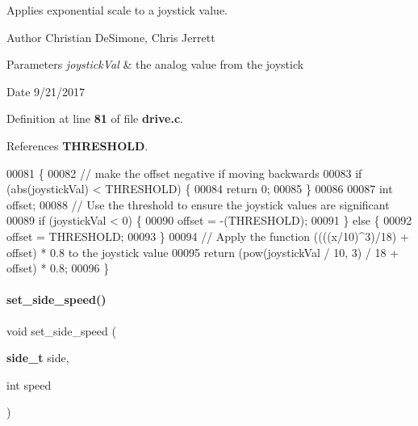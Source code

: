 Applies exponential scale to a joystick value. 

\begin{DoxyAuthor}{Author}
Christian De\+Simone, Chris Jerrett 
\end{DoxyAuthor}

\begin{DoxyParams}{Parameters}
{\em joystick\+Val} & the analog value from the joystick \\
\hline
\end{DoxyParams}
\begin{DoxyDate}{Date}
9/21/2017 
\end{DoxyDate}


Definition at line \textbf{ 81} of file \textbf{ drive.\+c}.



References \textbf{ T\+H\+R\+E\+S\+H\+O\+LD}.


\begin{DoxyCode}
00081                                           \{
00082   \textcolor{comment}{// make the offset negative if moving backwards}
00083   \textcolor{keywordflow}{if} (abs(joystickVal) < THRESHOLD) \{
00084     \textcolor{keywordflow}{return} 0;
00085   \}
00086 
00087   \textcolor{keywordtype}{int} offset;
00088   \textcolor{comment}{// Use the threshold to ensure the joystick values are significant}
00089   \textcolor{keywordflow}{if} (joystickVal < 0) \{
00090     offset = -(THRESHOLD);
00091   \} \textcolor{keywordflow}{else} \{
00092     offset = THRESHOLD;
00093   \}
00094   \textcolor{comment}{// Apply the function ((((x/10)^3)/18) + offset) * 0.8 to the joystick value}
00095   \textcolor{keywordflow}{return} (pow(joystickVal / 10, 3) / 18 + offset) * 0.8;
00096 \}
\end{DoxyCode}
\mbox{\label{a00092_a8df41fd50094c065eedc81fc5e6595d1}} 
\paragraph{set\+\_\+side\+\_\+speed()}
{\footnotesize\ttfamily void set\+\_\+side\+\_\+speed (\begin{DoxyParamCaption}\item[{\textbf{ side\+\_\+t}}]{side,  }\item[{int}]{speed }\end{DoxyParamCaption})}



